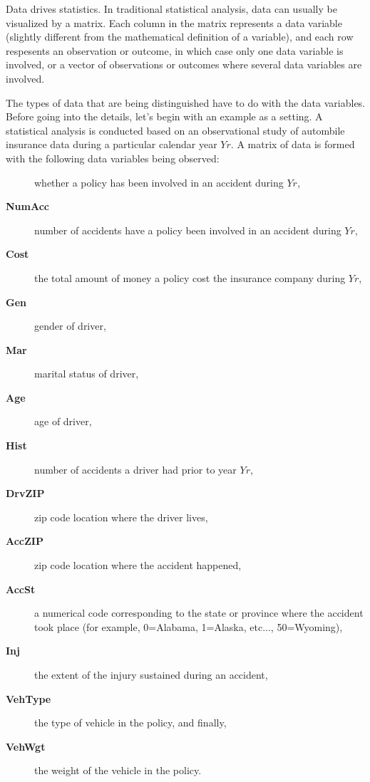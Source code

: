 \documentclass[12pt]{article}
\begin{document}

Data drives statistics.  In traditional statistical analysis, data can usually be visualized by a matrix.  Each column in the matrix represents a data variable (slightly different from the mathematical definition of a variable), and each row respesents an observation or outcome, in which case only one data variable is involved, or a vector of observations or outcomes where several data variables are involved.  

The types of data that are being distinguished have to do with the data variables.  Before going into the details, let's begin with an example as a setting.  A statistical analysis is conducted based on an observational study of autombile insurance data during a particular calendar year $Yr$.  A matrix of data is formed with the following data variables being observed:  
\begin{description}
\item[\textbf{}] whether a policy has been involved in an accident during $Yr$, 
\item[\textbf{NumAcc}] number of accidents have a policy been involved in an accident during $Yr$, 
\item[\textbf{Cost}] the total amount of money a policy cost the insurance company during $Yr$, 
\item[\textbf{Gen}] gender of driver, 
\item[\textbf{Mar}] marital status of driver, 
\item[\textbf{Age}] age of driver, 
\item[\textbf{Hist}] number of accidents a driver had prior to year $Yr$,
\item[\textbf{DrvZIP}] zip code location where the driver lives, 
\item[\textbf{AccZIP}] zip code location where the accident happened, 
\item[\textbf{AccSt}] a numerical code corresponding to the state or province where the accident took place (for example, 0=Alabama, 1=Alaska, etc..., 50=Wyoming),
\item[\textbf{Inj}] the extent of the injury sustained during an accident, 
\item[\textbf{VehType}] the type of vehicle in the policy, and finally, 
\item[\textbf{VehWgt}] the weight of the vehicle in the policy.
\end{description}
\end{document}
